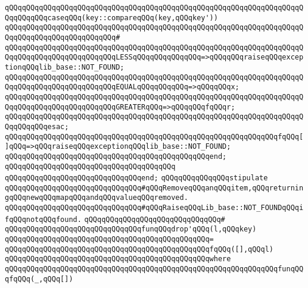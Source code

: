 \verb|qQQqqQQqqQQqqQQqqQQqqQQqqQQqqQQqqQQqqQQqqQQqqQQqqQQqqQQqqQQqqQQqqQQqqQQqqQQqqQQqcaseqQQq(key::compareqQQq(key,qQQqkey'))|\newline
\verb|qQQqqQQqqQQqqQQqqQQqqQQqqQQqqQQqqQQqqQQqqQQqqQQqqQQqqQQqqQQqqQQqqQQqqQQqqQQqqQQqqQQqqQQqqQQqqQQq#|\newline
\verb|qQQqqQQqqQQqqQQqqQQqqQQqqQQqqQQqqQQqqQQqqQQqqQQqqQQqqQQqqQQqqQQqqQQqqQQqqQQqqQQqqQQqqQQqqQQqqQQqLESSqQQqqQQqqQQqqQQq=>qQQqqQQqraiseqQQqexceptionqQQqlib_base::NOT_FOUND;|\newline
\verb|qQQqqQQqqQQqqQQqqQQqqQQqqQQqqQQqqQQqqQQqqQQqqQQqqQQqqQQqqQQqqQQqqQQqqQQqqQQqqQQqqQQqqQQqqQQqqQQqEQUALqQQqqQQqqQQq=>qQQqqQQqx;|\newline
\verb|qQQqqQQqqQQqqQQqqQQqqQQqqQQqqQQqqQQqqQQqqQQqqQQqqQQqqQQqqQQqqQQqqQQqqQQqqQQqqQQqqQQqqQQqqQQqqQQqGREATERqQQq=>qQQqqQQqfqQQqr;|\newline
\verb|qQQqqQQqqQQqqQQqqQQqqQQqqQQqqQQqqQQqqQQqqQQqqQQqqQQqqQQqqQQqqQQqqQQqqQQqqQQqqQQqesac;|\newline
\newline
\verb|qQQqqQQqqQQqqQQqqQQqqQQqqQQqqQQqqQQqqQQqqQQqqQQqqQQqqQQqqQQqqQQqfqQQq[]qQQq=>qQQqraiseqQQqexceptionqQQqlib_base::NOT_FOUND;|\newline
\verb|qQQqqQQqqQQqqQQqqQQqqQQqqQQqqQQqqQQqqQQqqQQqqQQqend;|\newline
\verb|qQQqqQQqqQQqqQQqqQQqqQQqqQQqqQQqqQQqqQQq|\newline
\verb|qQQqqQQqqQQqqQQqqQQqqQQqqQQqqQQqend;|\newline
\newline
\verb|qQQqqQQqqQQqqQQqstipulate|\newline
\verb|qQQqqQQqqQQqqQQqqQQqqQQqqQQqqQQq#qQQqRemoveqQQqanqQQqitem,qQQqreturningqQQqnewqQQqmapqQQqandqQQqvalueqQQqremoved.|\newline
\verb|qQQqqQQqqQQqqQQqqQQqqQQqqQQqqQQq#qQQqRaiseqQQqLib_base::NOT_FOUNDqQQqifqQQqnotqQQqfound.|\newline
\verb|qQQqqQQqqQQqqQQqqQQqqQQqqQQqqQQq#|\newline
\verb|qQQqqQQqqQQqqQQqqQQqqQQqqQQqqQQqfunqQQqdrop'qQQq(l,qQQqkey)|\newline
\verb|qQQqqQQqqQQqqQQqqQQqqQQqqQQqqQQqqQQqqQQqqQQqqQQq=|\newline
\verb|qQQqqQQqqQQqqQQqqQQqqQQqqQQqqQQqqQQqqQQqqQQqqQQqfqQQq([],qQQql)|\newline
\verb|qQQqqQQqqQQqqQQqqQQqqQQqqQQqqQQqqQQqqQQqqQQqqQQqwhere|\newline
\verb|qQQqqQQqqQQqqQQqqQQqqQQqqQQqqQQqqQQqqQQqqQQqqQQqqQQqqQQqqQQqqQQqfunqQQqfqQQq(_,qQQq[])|\newline
